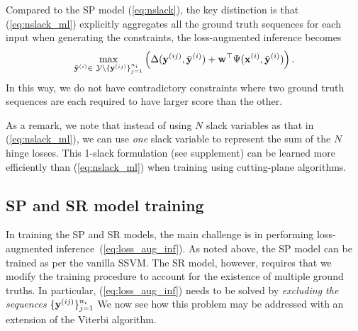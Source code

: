 Compared to the SP model (\ref{eq:nslack}), the key distinction is that (\ref{eq:nslack_ml})
explicitly aggregates all the ground truth sequences for each input when generating the constraints,
\ie the loss-augmented inference becomes
\begin{equation}
\label{eq:loss_aug_inf}
\max_{\bar{\mathbf{y}}^{(i)} \in \ \mathcal{Y} \setminus \{\mathbf{y}^{(ij)}\}_{j=1}^{n_i}}
     \left( \Delta(\mathbf{y}^{(ij)}, \bar{\mathbf{y}}^{(i)}) + \mathbf{w}^\top \Psi(\mathbf{x}^{(i)}, \bar{\mathbf{y}}^{(i)}) \right).
\end{equation}
In this way, we do not have contradictory constraints where
two ground truth sequences are each required to have larger score than the other.

As a remark, we note that instead of using $N$ slack variables as that in (\ref{eq:nslack_ml}),
we can use \emph{one} slack variable to represent the sum of the $N$ hinge losses. %
This 1-slack formulation (see supplement) can be learned more efficiently than (\ref{eq:nslack_ml})
when training using cutting-plane algorithms. %


\secmoveup
\subsection{SP and SR model training}
\label{ssec:training}

In training the SP and SR models, the main challenge is in performing loss-augmented inference~(\ref{eq:loss_aug_inf}).
As noted above, the SP model can be trained as per the vanilla SSVM.
The SR model, however, requires that we modify the training procedure to account for the existence of multiple ground truths.
In particular, (\ref{eq:loss_aug_inf}) needs to be solved by \emph{excluding the sequences} $\{\mathbf{y}^{({ij})}\}_{j=1}^{n_i}$ We now see how this problem may be addressed with an extension of the Viterbi algorithm.

